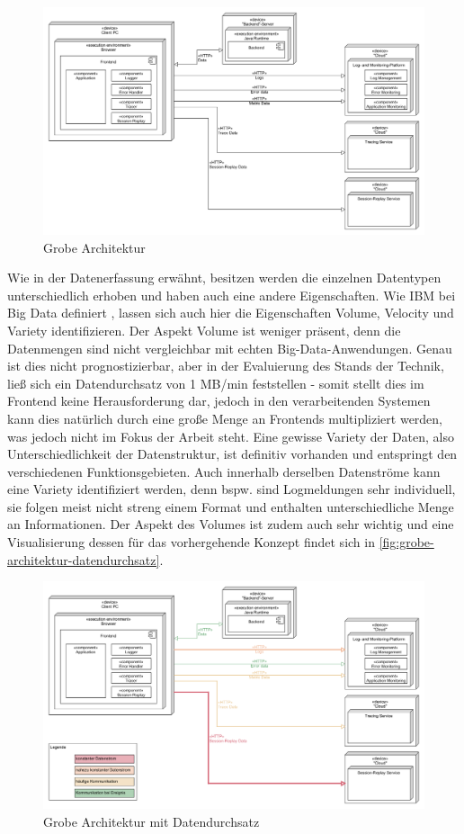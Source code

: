 \begin{figure}[H]
	\centering
	\includegraphics[width=0.75\linewidth]{img/loesungsansatz/konzept-simple.png}
	\caption{Grobe Architektur}
	\label{fig:grobe-architektur}
\end{figure}

Wie in der Datenerfassung erwähnt, besitzen werden die einzelnen Datentypen unterschiedlich erhoben und haben auch eine andere Eigenschaften. Wie IBM bei Big Data definiert \cite{ZikopoulosUnderstandingBigData}, lassen sich auch hier die Eigenschaften Volume, Velocity und Variety identifizieren. Der Aspekt Volume ist weniger präsent, denn die Datenmengen sind nicht vergleichbar mit echten Big-Data-Anwendungen. Genau ist dies nicht prognostizierbar, aber in der Evaluierung des Stands der Technik, ließ sich ein Datendurchsatz von 1 MB/min feststellen - somit stellt dies im Frontend keine Herausforderung dar, jedoch in den verarbeitenden Systemen kann dies natürlich durch eine große Menge an Frontends multipliziert werden, was jedoch nicht im Fokus der Arbeit steht. Eine gewisse Variety der Daten, also Unterschiedlichkeit der Datenstruktur, ist definitiv vorhanden und entspringt den verschiedenen Funktionsgebieten. Auch innerhalb derselben Datenströme kann eine Variety identifiziert werden, denn bspw. sind Logmeldungen sehr individuell, sie folgen meist nicht streng einem Format und enthalten unterschiedliche Menge an Informationen. Der Aspekt des Volumes ist zudem auch sehr wichtig und eine Visualisierung dessen für das vorhergehende Konzept findet sich in \autoref{fig:grobe-architektur-datendurchsatz}.
	
\begin{figure}[H]
	\centering
	\includegraphics[width=0.75\linewidth]{img/loesungsansatz/konzept-datendurchsatz.png}
	\caption{Grobe Architektur mit Datendurchsatz}
	\label{fig:grobe-architektur-datendurchsatz}
\end{figure}

